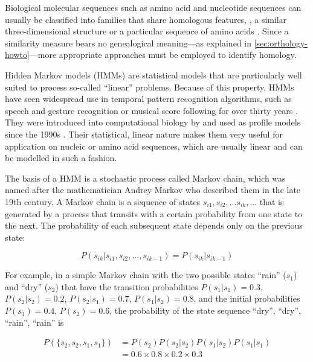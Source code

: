 \label{sec:hmms}
Biological molecular sequences such as amino acid and nucleotide sequences can
usually be classified into families that share homologous features, \eg, a
similar three-dimensional structure or a particular sequence of amino acids
\citep{henikoff1997}. Since a similarity measure bears no genealogical
meaning---as explained in \autoref{sec:orthology-howto}---more appropriate
approaches must be employed to identify homology.

Hidden Markov models (HMMs) are statistical models that are particularly well
suited to process so-called ``linear'' problems. Because of this property, HMMs
have seen widespread use in temporal pattern recognition algorithms, such as
speech and gesture recognition or musical score following for over thirty years
\citep{rabiner1989}. They were introduced into computational biology by
\citet{churchill1989} and used as profile models since the 1990s
\citep{krogh1994}. Their statistical, linear nature makes them very useful for
application on nucleic or amino acid sequences, which are usually linear and can
be modelled in such a fashion. 

The basis of a HMM is a stochastic process called Markov chain, which was named
after the mathematician Andrey Markov who described them in the late 19th
century. A Markov chain is a sequence of states $s_{i1}, s_{i2}, ...  s_{ik},
...$ that is generated by a process that transits with a certain probability
from one state to the next. The probability of each subsequent state depends
only on the previous state:

\begin{equation}
P(s_{ik} | s_{i1}, s_{i2}, ..., s_{ik-1}) = P(s_{ik} | s_{ik-1})
\label{eqn:markov-chain}
\end{equation}

For example, in a simple Markov chain with the two possible states ``rain''
($s_1$) and ``dry'' ($s_2$) that have the transition probabilities $P(s_1|s_1) =
0.3$, $P(s_2|s_2) = 0.2$, $P(s_2|s_1) = 0.7$, $P(s_1|s_2) = 0.8$, and the
initial probabilities $P(s_1) = 0.4$, $P(s_2) = 0.6$, the probability of the
state sequence ``dry'', ``dry'', ``rain'', ``rain'' is

\begin{equation}
	\begin{split}
		P(\{s_2, s_2, s_1, s_1\}) &= P(s_2) P(s_2|s_2) P(s_1|s_2) P(s_1|s_1) \\
		&= 0.6 \times 0.8 \times 0.2 \times 0.3 
	\end{split}
\label{eqn:markov-chain-weather}
\end{equation}

